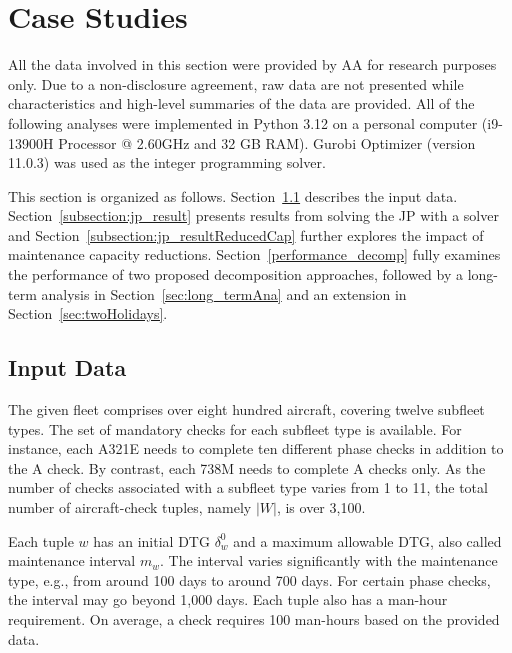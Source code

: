 \section{Case Studies}
\label{section:case_studies}

All the data involved in this section were provided by AA for research purposes only. Due to a non-disclosure agreement, raw data are not presented while characteristics and high-level summaries of the data are provided. All of the following analyses were implemented in Python 3.12 on a personal computer (i9-13900H  Processor @ 2.60GHz and 32 GB RAM). Gurobi Optimizer (version 11.0.3) was used as the integer programming solver. 

This section is organized as follows.
Section~\ref{sec:real-world-data} describes the input data. Section~\ref{subsection:jp_result} presents results from solving the JP with a solver and Section~\ref{subsection:jp_resultReducedCap} further explores the impact of maintenance capacity reductions. Section~\ref{performance_decomp} fully examines the performance of two proposed decomposition approaches, followed by a long-term analysis in Section~\ref{sec:long_termAna} and an extension in Section~\ref{sec:twoHolidays}.

\subsection{Input Data}
\label{sec:real-world-data}

The given fleet comprises over eight hundred aircraft, covering twelve subfleet types. The set of mandatory checks for each subfleet type is available. For instance, each A321E needs to complete ten different phase checks in addition to the A check. By contrast, each 738M needs to complete A checks only. As the number of checks associated with a subfleet type varies from 1 to 11, the total number of aircraft-check tuples, namely $|W|$, is over 3,100.

Each tuple $w$ has an initial DTG $\delta_w^0$ and a maximum allowable DTG, also called maintenance interval $m_w$. The interval varies significantly with the maintenance type, e.g., from around 100 days to around 700 days. For certain phase checks, the interval may go beyond 1,000 days. Each tuple also has a man-hour requirement. On average, a check requires 100 man-hours based on the provided data. 


